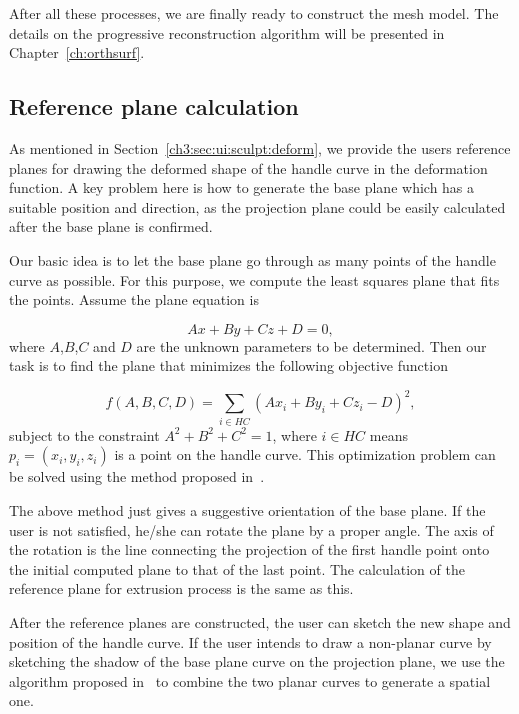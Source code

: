 After all these processes, we are finally ready to construct  the
mesh model. The details on the progressive reconstruction algorithm
will be presented in Chapter~\ref{ch:orthsurf}.


\subsection{Reference plane calculation}
\label{ch3:sec:algo:refplane}

As mentioned in Section~\ref{ch3:sec:ui:sculpt:deform}, we  provide
the users reference planes for drawing the deformed shape of the
handle curve in the deformation function. A key problem here is how
to generate the base plane which has a suitable position and
direction, as the projection plane could be easily calculated after
the base plane is confirmed.

Our basic idea is to let the base plane go through as many points of
the handle curve as possible. For this purpose, we compute the least
squares plane that fits the points. Assume the plane equation is

\begin{equation}
\label{eq:planefunc}
    Ax+By+Cz+D=0,\nonumber
\end{equation}
where $A$,$B$,$C$ and $D$ are the unknown parameters to be determined. Then our task is to find the plane that minimizes the following objective function

\begin{equation}
\label{eq:planeobjnoZ0}
    f(A,B,C,D)=\sum\limits_{i \in HC} {(Ax_i+By_i+Cz_i-D)^2},
\end{equation}
subject to the constraint $A^2+B^2+C^2=1$, where $i \in HC$  means
$p_i=(x_i,y_i,z_i)$ is a point on the handle curve. This
optimization problem can be solved using the method proposed
in~\cite{SWMB59}.

The above method just gives a suggestive orientation  of the base
plane. If the user is not satisfied, he/she can rotate the plane by
a proper angle. The axis of the rotation is the line connecting the
projection of the first handle point onto the initial computed plane
to that of the last point. The calculation of the reference plane
for extrusion process is the same as this.

After the reference planes are constructed, the user  can sketch the
new shape and position of the handle curve. If the user intends to
draw a non-planar curve by sketching the shadow of the base plane
curve on the projection plane, we use the algorithm proposed
in~\cite{CMZHB99} to combine the two planar curves to generate a
spatial one.

